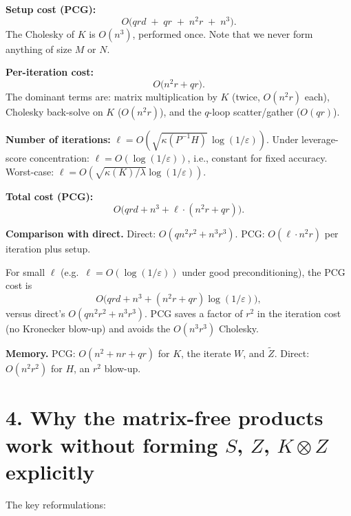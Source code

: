 \textbf{Setup cost (PCG):}
\[
O\bigl(qrd \;+\; qr \;+\; n^2 r \;+\; n^3\bigr).
\]
The Cholesky of $K$ is $O(n^3)$, performed once.  Note that we never form anything of size $M$ or $N$.

\textbf{Per-iteration cost:}
\[
O\bigl(n^2 r + qr\bigr).
\]
The dominant terms are: matrix multiplication by $K$ (twice, $O(n^2r)$ each), Cholesky back-solve on $K$ ($O(n^2 r)$), and the $q$-loop scatter/gather ($O(qr)$).

\textbf{Number of iterations:} $\ell = O(\sqrt{\kappa(P^{-1}H)}\,\log(1/\varepsilon))$.  Under leverage-score concentration: $\ell=O(\log(1/\varepsilon))$, i.e., constant for fixed accuracy.  Worst-case: $\ell=O(\sqrt{\kappa(K)/\lambda}\log(1/\varepsilon))$.

\textbf{Total cost (PCG):}
\[
O\bigl(qrd + n^3 + \ell\cdot(n^2 r + qr)\bigr).
\]

\textbf{Comparison with direct.}  Direct: $O(qn^2r^2+n^3r^3)$.  PCG: $O(\ell\cdot n^2r)$ per iteration plus setup.

For small $\ell$ (e.g.\ $\ell=O(\log(1/\varepsilon))$ under good preconditioning), the PCG cost is
\[
O\bigl(qrd + n^3 + (n^2r+qr)\log(1/\varepsilon)\bigr),
\]
versus direct's $O(qn^2r^2+n^3r^3)$.  PCG saves a factor of $r^2$ in the iteration cost (no Kronecker blow-up) and avoids the $O(n^3r^3)$ Cholesky.

\textbf{Memory.}  PCG: $O(n^2 + nr + qr)$ for $K$, the iterate $W$, and $\widetilde Z$.  Direct: $O(n^2r^2)$ for $H$, an $r^2$ blow-up.

\section*{4. Why the matrix-free products work without forming $S$, $Z$, $K\otimes Z$ explicitly}

The key reformulations:

